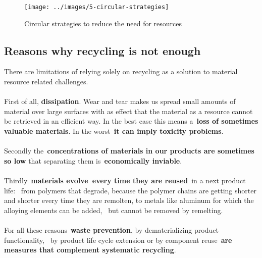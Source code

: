 \documentclass[../summary.tex]{subfiles}
\begin{document}
	\begin{figure}[H]
		\centering
		\texttt{[image: ../images/5-circular-strategies]}
		\caption{Circular strategies to reduce the need for resources}
		\label{fig:5-circular-strategies}
	\end{figure}
	
	\subsection{Reasons why recycling is not enough}
	
	There are limitations of relying solely on recycling as a solution to material resource related challenges. 
	\\
	\\
	First of all, \textbf{dissipation}. Wear and tear makes us spread small amounts of material over large surfaces with as effect that the material as a resource cannot be retrieved in an efficient way. In the best case this means a \textbf{loss of sometimes valuable materials}. In the worst \textbf{it can imply toxicity problems}.
	\\
	\\
	Secondly the \textbf{concentrations of materials in our products are sometimes so low} that separating them is \textbf{economically inviable}. 
	\\
	\\
	Thirdly \textbf{materials evolve every time they are reused} in a next product life:  from polymers that degrade, because the polymer chains are getting shorter and shorter every time they are remolten, to metals like aluminum for which the alloying elements can be added,  but cannot be removed by remelting.
	\\
	\\
	For all these reasons \textbf{waste prevention}, by dematerializing product functionality,  by product life cycle extension or by component reuse \textbf{are measures that complement systematic recycling}. 
	
\end{document}
